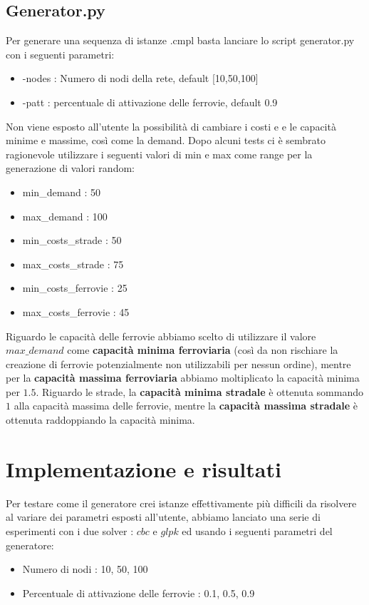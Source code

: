 \documentclass{article}
\begin{document}
\subsection{Generator.py}
Per generare una sequenza di istanze .cmpl basta lanciare lo script generator.py con i seguenti parametri:

\begin{itemize}
    \item -nodes : Numero di nodi della rete, default [10,50,100]
    \item -patt : percentuale di attivazione delle ferrovie, default 0.9
\end{itemize}
Non viene esposto all'utente la possibilità di cambiare i costi e e le capacità minime e massime, così come la demand. Dopo alcuni tests ci è sembrato ragionevole utilizzare i seguenti valori di min e max come range per la generazione di valori random:
\begin{itemize}
    \item min\_demand : 50
    \item max\_demand : 100
    \item min\_costs\_strade : 50
    \item max\_costs\_strade : 75
    \item min\_costs\_ferrovie : 25
    \item max\_costs\_ferrovie : 45
\end{itemize}

Riguardo le capacità delle ferrovie abbiamo scelto di utilizzare il valore $max\_demand$ come \textbf{capacità minima ferroviaria} (così da non rischiare la creazione di ferrovie potenzialmente non utilizzabili per nessun ordine), mentre per la \textbf{capacità massima ferroviaria} abbiamo moltiplicato la capacità minima per $1.5$. Riguardo le strade, la \textbf{capacità minima stradale} è ottenuta sommando $1$ alla capacità massima delle ferrovie, mentre la \textbf{capacità massima stradale} è ottenuta raddoppiando la capacità minima.


\section{Implementazione e risultati}



Per testare come il generatore crei istanze effettivamente più difficili da risolvere al variare dei parametri esposti all'utente, abbiamo lanciato una serie di esperimenti con i due solver : $cbc$ e $glpk$ ed usando i seguenti parametri del generatore:
\begin{itemize}
    \item Numero di nodi : 10, 50, 100
    \item Percentuale di attivazione delle ferrovie : 0.1, 0.5, 0.9
\end{itemize}
\end{document}
